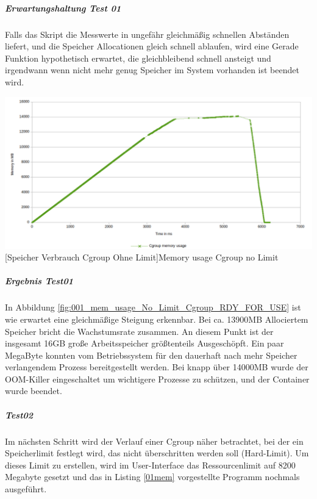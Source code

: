 \vspace{1em}


\subparagraph{Erwartungshaltung Test 01}
Falls das Skript die Messwerte in ungefähr gleichmäßig schnellen Abständen liefert, und die Speicher Allocationen gleich schnell ablaufen, wird eine Gerade Funktion hypothetisch erwartet, die gleichbleibend schnell ansteigt und irgendwann wenn nicht mehr genug Speicher im System vorhanden ist beendet wird.

\vspace{1em}
\begin{minipage}{\linewidth}
	\centering
	\includegraphics[width=1\linewidth]{pics/001_mem_usage_No_Limit_Cgroup_RDY_FOR_USE.png}
	[Speicher Verbrauch Cgroup Ohne Limit]{Memory usage Cgroup no Limit}
	\label{fig:001_mem_usage_No_Limit_Cgroup_RDY_FOR_USE}
\end{minipage}

\subparagraph{Ergebnis Test01}
In Abbildung \ref{fig:001_mem_usage_No_Limit_Cgroup_RDY_FOR_USE} ist wie erwartet eine gleichmäßige Steigung erkennbar. Bei ca. 13900MB Allociertem Speicher bricht die Wachstumsrate zusammen. An diesem Punkt ist der insgesamt 16GB große Arbeitsspeicher größtenteils Ausgeschöpft. Ein paar MegaByte konnten vom Betriebssystem für den dauerhaft nach mehr Speicher verlangendem Prozess bereitgestellt werden. Bei knapp über 14000MB wurde der OOM-Killer eingeschaltet um wichtigere Prozesse zu schützen, und der Container wurde beendet.

\subparagraph{Test02}
Im nächsten Schritt wird der Verlauf einer Cgroup näher betrachtet, bei der ein Speicherlimit festlegt wird, das nicht überschritten werden soll (Hard-Limit). Um dieses Limit zu erstellen, wird im User-Interface  das Ressourcenlimit auf 8200 Megabyte gesetzt und das in Listing \ref{01mem} vorgestellte Programm nochmals ausgeführt.

